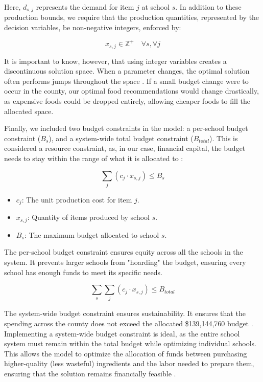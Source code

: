 \documentclass[journal]{IEEEtran}
\begin{document}
Here, $d_{s,j}$ represents the demand for item $j$ at school $s$. In addition to these production bounds, we require that the production quantities, represented by the decision variables, be non-negative integers, enforced by:

\begin{equation}
    x_{s,j} \in \mathbb{Z}^+ \quad \forall s, \forall j
\end{equation}

It is important to know, however, that using integer variables creates a discontinuous solution space. When a parameter changes, the optimal solution often performs jumps throughout the space \cite{algo_milp}. If a small budget change were to occur in the county, our optimal food recommendations would change drastically, as expensive foods could be dropped entirely, allowing cheaper foods to fill the allocated space.

Finally, we included two budget constraints in the model: a per-school budget constraint ($B_s$), and a system-wide total budget constraint ($B_{total}$). This is considered a resource constraint, as, in our case, financial capital, the budget needs to stay within the range of what it is allocated to \cite{py_milp}:

\begin{equation}
    \sum_{j} (c_{j} \cdot  x_{s,j}) \leq B_{s}
    \label{eq:school_budget}
\end{equation}

\begin{itemize}
    \item $c_j$: The unit production cost for item $j$.
    \item $x_{s,j}$: Quantity of items produced by school $s$.
    \item $B_s$: The maximum budget allocated to school $s$.
\end{itemize}

The per-school budget constraint ensures equity across all the schools in the system. It prevents larger schools from "hoarding" the budget, ensuring every school has enough funds to meet its specific needs.

\begin{equation}
    \sum_{s}\sum_{j} (c_{j} \cdot x_{s,j}) \leq B_{total}
    \label{eq:total_budget}
\end{equation}

The system-wide budget constraint ensures sustainability. It ensures that the spending across the county does not exceed the allocated \$139,144,760 budget \cite{fcpsbudget}. Implementing a system-wide budget constraint is ideal, as the entire school system must remain within the total budget while optimizing individual schools. This allows the model to optimize the allocation of funds between purchasing higher-quality (less wasteful) ingredients and the labor needed to prepare them, ensuring that the solution remains financially feasible \cite{cobuloglu}.
\end{document}
